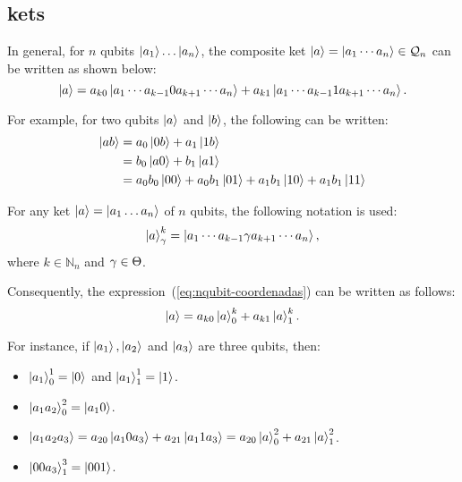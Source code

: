 \subsection{kets}

In general, for $n$ qubits $\ket{a_1}\dots\ket{a_n}$, the composite ket  $\ket{a}=\ket{a_1\cdots a_n}\in\mathcal{Q}_n$  can be written as shown below:
\begin{equation}
	\label{eq:nqubit-coordenadas}
	\ket{a}=a_{k0}\ket{a_1\cdots a_{k-1}0a_{k+1}\cdots a_n}+a_{k1}\ket{a_1\cdots a_{k-1}1a_{k+1}\cdots a_n}.
\end{equation}

For example, for two qubits $\ket{a}$ and $\ket{b}$, the following can be written:
\begin{align}
	\ket{ab}&=a_0\ket{0b}+a_1\ket{1b}\\
	&=b_0\ket{a0}+b_1\ket{a1}\\
	\label{eq:2qubit-coordenadas}
	&=a_0 b_0\ket{00}+a_0 b_1\ket{01}+a_1 b_1\ket{10}+a_1 b_1\ket{11}
\end{align}

\begin{notation}
	For any ket $\ket{a}=\ket{a_1\dots a_n}$ of $n$ qubits, the following notation is used:
	\begin{equation}
		\label{eq:nqubit-only-one-state}
		\ket{a}^{k}_{\gamma} = \ket{a_1\cdots a_{k-1}\gamma a_{k+1}\cdots a_n},
	\end{equation}
	where $k \in \mathbb{N}_n$ and $\gamma\in\Theta$.
\end{notation}

Consequently, the expression~(\ref{eq:nqubit-coordenadas}) can be written as follows:
\begin{equation}
	\label{eq:canonical-state}
	\ket{a}= a_{k0}\ket{a}^{k}_{0}+a_{k1}\ket{a}^{k}_{1}.
\end{equation}

For instance, if $\ket{a_1},\ket{a_2}$ and $\ket{a_3}$ are three qubits, then:
\begin{itemize}
	\item $\ket{a_1}^{1}_{0}=\ket{0}$ and $\ket{a_1}^{1}_{1}=\ket{1}$.
	\item $\ket{a_1 a_2}^{2}_{0}=\ket{a_1 0}$.
	\item $\ket{a_1 a_2 a_3}=a_{20}\ket{a_1 0 a_3}+a_{21}\ket{a_1 1 a_3}=a_{20}\ket{a}^{2}_{0}+a
	_{21}\ket{a}^{2}_{1}$.
	\item $\ket{00a_3}^{3}_{1}=\ket{001}$.
\end{itemize}

